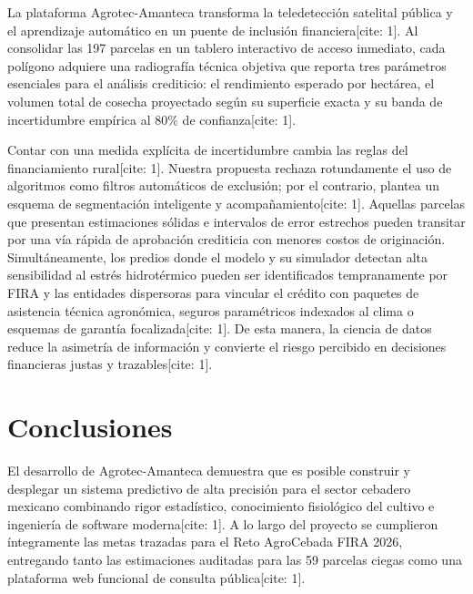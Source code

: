 \documentclass[11pt,a4paper]{article}
\begin{document}
La plataforma Agrotec-Amanteca transforma la teledetección satelital pública y el aprendizaje automático en un puente de inclusión financiera[cite: 1]. Al consolidar las 197 parcelas en un tablero interactivo de acceso inmediato, cada polígono adquiere una radiografía técnica objetiva que reporta tres parámetros esenciales para el análisis crediticio: el rendimiento esperado por hectárea, el volumen total de cosecha proyectado según su superficie exacta y su banda de incertidumbre empírica al 80\% de confianza[cite: 1].

Contar con una medida explícita de incertidumbre cambia las reglas del financiamiento rural[cite: 1]. Nuestra propuesta rechaza rotundamente el uso de algoritmos como filtros automáticos de exclusión; por el contrario, plantea un esquema de segmentación inteligente y acompañamiento[cite: 1]. Aquellas parcelas que presentan estimaciones sólidas e intervalos de error estrechos pueden transitar por una vía rápida de aprobación crediticia con menores costos de originación. Simultáneamente, los predios donde el modelo y su simulador detectan alta sensibilidad al estrés hidrotérmico pueden ser identificados tempranamente por FIRA y las entidades dispersoras para vincular el crédito con paquetes de asistencia técnica agronómica, seguros paramétricos indexados al clima o esquemas de garantía focalizada[cite: 1]. De esta manera, la ciencia de datos reduce la asimetría de información y convierte el riesgo percibido en decisiones financieras justas y trazables[cite: 1].

\section{Conclusiones}
El desarrollo de Agrotec-Amanteca demuestra que es posible construir y desplegar un sistema predictivo de alta precisión para el sector cebadero mexicano combinando rigor estadístico, conocimiento fisiológico del cultivo e ingeniería de software moderna[cite: 1]. A lo largo del proyecto se cumplieron íntegramente las metas trazadas para el Reto AgroCebada FIRA 2026, entregando tanto las estimaciones auditadas para las 59 parcelas ciegas como una plataforma web funcional de consulta pública[cite: 1].
\end{document}
